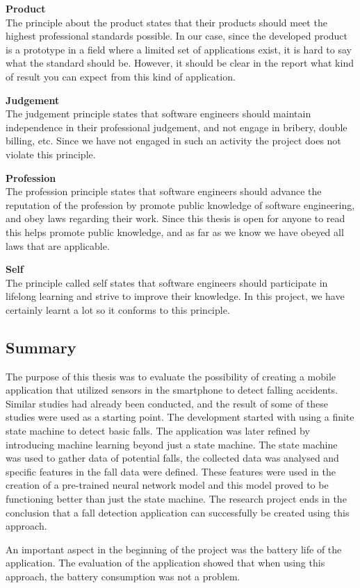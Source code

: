 \documentclass[12pt, a4paper, onecolumn]{article}
\newcommand{\parag}[1]{
	\textbf{#1} \hspace{0pt} \\
}
\begin{document}
	\parag{Product}
	The principle about the product states that their products should meet the highest professional standards possible. In our case, since the developed product is a prototype in a field where a limited set of applications exist, it is hard to say what the standard should be. However, it should be clear in the report what kind of result you can expect from this kind of application.
	
	\parag{Judgement}
	The judgement principle states that software engineers should maintain independence in their professional judgement, and not engage in bribery, double billing, etc. Since we have not engaged in such an activity the project does not violate this principle.
	
	\parag{Profession}
	The profession principle states that software engineers should advance the reputation of the profession by promote public knowledge of software engineering, and obey laws regarding their work. Since this thesis is open for anyone to read this helps promote public knowledge, and as far as we know we have obeyed all laws that are applicable.
	
	\parag{Self}
	The principle called self states that software engineers should participate in lifelong learning and strive to improve their knowledge. In this project, we have certainly learnt a lot so it conforms to this principle.
	
	\subsection{Summary}
	
	The purpose of this thesis was to evaluate the possibility of creating a mobile application that utilized sensors in the smartphone to detect falling accidents. Similar studies had already been conducted, and the result of some of these studies were used as a starting point. The development started with using a finite state machine to detect basic falls. The application was later refined by introducing machine learning beyond just a state machine. The state machine was used to gather data of potential falls, the collected data was analysed and specific features in the fall data were defined. These features were used in the creation of a pre-trained neural network model and this model proved to be functioning better than just the state machine. The research project ends in the conclusion that a fall detection application can successfully be created using this approach.
	
	An important aspect in the beginning of the project was the battery life of the application. The evaluation of the application showed that when using this approach, the battery consumption was not a problem.
	
\end{document}
